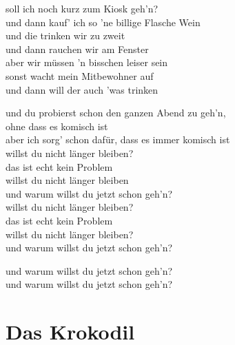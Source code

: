 \documentclass[]{book}
\begin{document}
soll ich noch kurz zum Kiosk geh'n?\\
und dann kauf' ich so 'ne billige Flasche Wein\\
und die trinken wir zu zweit\\
und dann rauchen wir am Fenster\\
aber wir müssen 'n bisschen leiser sein\\
sonst wacht mein Mitbewohner auf\\
und dann will der auch 'was trinken

und du probierst schon den ganzen Abend zu geh'n,\\
ohne dass es komisch ist\\
aber ich sorg' schon dafür, dass es immer komisch ist\\
willst du nicht länger bleiben?\\
das ist echt kein Problem\\
willst du nicht länger bleiben\\
und warum willst du jetzt schon geh'n?\\
willst du nicht länger bleiben?\\
das ist echt kein Problem\\
willst du nicht länger bleiben?\\
und warum willst du jetzt schon geh'n?

und warum willst du jetzt schon geh'n?\\
und warum willst du jetzt schon geh'n?

\hypertarget{das-krokodil}{%
\section{Das Krokodil}\label{das-krokodil}}
\end{document}

